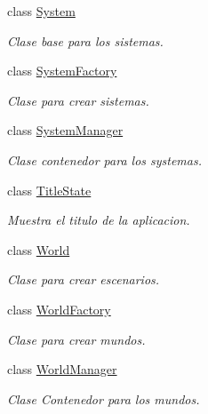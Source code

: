 \begin{DoxyCompactItemize}
class \hyperlink{classant_1_1_system}{System}
\begin{DoxyCompactList}\small\item\em Clase base para los sistemas. \end{DoxyCompactList}\item 
class \hyperlink{classant_1_1_system_factory}{System\+Factory}
\begin{DoxyCompactList}\small\item\em Clase para crear sistemas. \end{DoxyCompactList}\item 
class \hyperlink{classant_1_1_system_manager}{System\+Manager}
\begin{DoxyCompactList}\small\item\em Clase contenedor para los systemas. \end{DoxyCompactList}\item 
class \hyperlink{classant_1_1_title_state}{Title\+State}
\begin{DoxyCompactList}\small\item\em Muestra el titulo de la aplicacion. \end{DoxyCompactList}\item 
class \hyperlink{classant_1_1_world}{World}
\begin{DoxyCompactList}\small\item\em Clase para crear escenarios. \end{DoxyCompactList}\item 
class \hyperlink{classant_1_1_world_factory}{World\+Factory}
\begin{DoxyCompactList}\small\item\em Clase para crear mundos. \end{DoxyCompactList}\item 
class \hyperlink{classant_1_1_world_manager}{World\+Manager}
\begin{DoxyCompactList}\small\item\em Clase Contenedor para los mundos. \end{DoxyCompactList}\end{DoxyCompactItemize}
